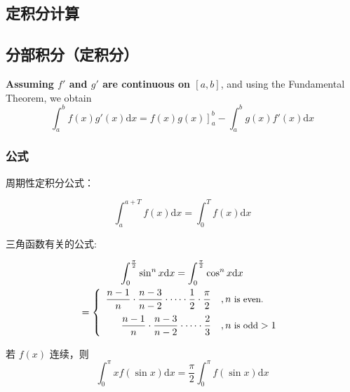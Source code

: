 \subsection{定积分计算}

\subsection{分部积分（定积分）}
\label{definite-integration-by-parts}

\begin{definition}
    \textbf{Assuming $f'$ and $g'$ are continuous on $[a, b]$}, 
    and using the Fundamental Theorem, we obtain
    \[
        \int_a^b f(x) g'(x) \mathrm dx = \left. f(x)g(x) \right]_a^b - \int_a^b g(x)f'(x) \mathrm dx
    \]
\end{definition}

\subsubsection{公式}

周期性定积分公式：
\begin{lemma}
    \begin{equation}
        \int_a^{a + T} f(x) \mathrm{d} x = \int_0^T f(x) \mathrm{d} x
    \end{equation}
\end{lemma}

三角函数有关的公式:
\begin{lemma}[点火公式]
    \begin{multline}\label{eq:launching-formula}
        \int_0^{\frac{\pi}{2}} \sin ^n x \mathrm{d} x = \int_0^{\frac{\pi}{2}} \cos ^n x \mathrm{d} x \\
        = 
        \left\{ 
            \begin{array}{rl}
                \dfrac{n - 1}{n} \cdot \dfrac{n - 3}{n - 2} \cdot \cdots \cdot \dfrac{1}{2} \cdot \dfrac{\pi}{2} &, n \mbox{\small \ is even.}   \\[1em]
                \dfrac{n - 1}{n} \cdot \dfrac{n - 3}{n - 2} \cdot \cdots \cdot \dfrac{2}{3}                      &, n \mbox{\small \ is odd} > 1 \\
            \end{array}
        \right.
    \end{multline}

    若 $f(x)$ 连续，则
    \begin{equation}
        \label{eq:magic-trig-integration-simplification-1}
        \int_0^{\pi} x f(\sin x) \mathrm{d} x = \dfrac{\pi}{2} \int_0^{\pi} f(\sin x) \mathrm{d} x
    \end{equation}
\end{lemma}

